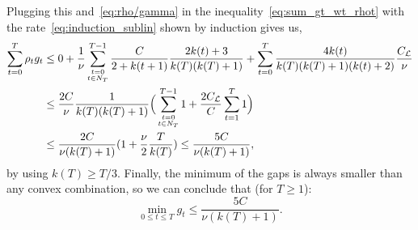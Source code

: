 \documentclass[twoside]{article}
\renewcommand{\L}{\mathcal{L}}
\newcommand{\gap}{g_{t}}
\newcommand{\CondNumb}{\nu}
\newcommand{\0}{\mathbf{0}} %
\begin{document}
  Plugging this and~\eqref{eq:rho/gamma} in the inequality~\eqref{eq:sum_gt_wt_rhot} with the rate~\eqref{eq:induction_sublin} shown by induction gives us,
  \begin{align}
       \sum_{t=0}^T \rho_t \gap 
        &\leq 
        0 +
        \frac{1}{\CondNumb} \sum_{\small\substack{t=0 \\ t \in N_{T} }}^{T-1} \frac{C}{2+k(t+1)}\frac{2k(t)+3}{k(T)(k(T)+1)} + 
         \sum_{t=0}^T \frac{4k(t)}{k(T)(k(T)+1)(k(t)+2)}\frac{C_\L}{\CondNumb} \\
        & \leq \frac{2C}{\CondNumb{}} \frac{1}{k(T)(k(T)+1)} \Big( \sum_{\small\substack{t=0 \\ t \in N_{T} }}^{T-1}  1 + \frac{2C_\L}{C} \sum_{t=1 }^T  1 \Big) \\
        & \leq \frac{2C}{\CondNumb (k(T)+1)} (1 + \frac{\CondNumb}{2}\frac{T}{k(T)}) \leq \frac{5C}{\CondNumb (k(T)+1)},
  \end{align}
  by using $k(T) \geq T/3$.
  Finally, the minimum of the gaps is always smaller than any convex combination, so we can conclude that (for $T\geq1$):
  \begin{equation}
    \min_{0 \leq t \leq T} \gap \leq \frac{5C}{\CondNumb{}(k(T)+1)}.
  \end{equation}
  \endproof
  

%
%
%
%
%
%
%
%
%
%
%
%
%
%
%
%
%
%
%
%
%
%
%
%
%
%
\end{document}

